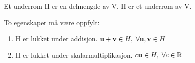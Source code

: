 Et underrom H er en delmengde av V.
H er et underrom av V.

To egenskaper må være oppfylt:
\begin{enumerate}
  \item H er lukket under addisjon.
        $\mathbf{u}+\mathbf{v}\in H,\ \forall \mathbf{u},\mathbf{v}\in H$
  \item H er lukket under skalarmultiplikasjon.
        $c\mathbf{u}\in H,\ \forall c\in\mathbb{R}$
\end{enumerate}
